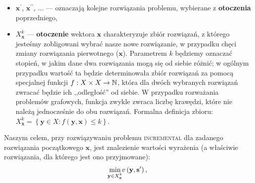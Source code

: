 \begin{itemize}
	\item $\textbf{x}^{\prime}$, $\textbf{x}^{\prime\prime}$, $\dots$ --- oznaczają kolejne rozwiązania problemu, wybierane z \textbf{otoczenia} poprzedniego,
	\item $X^{k}_{\textbf{x}}$ --- \textbf{otoczenie} wektora $\textbf{x}$ charakteryzuje zbiór rozwiązań, z którego jesteśmy zobligowani wybrać nasze nowe rozwiązanie, w przypadku chęci zmiany rozwiązania pierwotnego ($\textbf{x}$). Parametrem $k$ będziemy oznaczać stopień, w jakim dane dwa rozwiązania mogą się od siebie różnić; w ogólnym przypadku wartość ta będzie determinowała zbiór rozwiązań za pomocą specjalnej funkcji $f : X \times X \rightarrow \mathbb{N}$, która dla dwóch wybranych rozwiązań zwracać będzie ich ,,odległość'' od siebie.  W przypadku rozważania problemów grafowych, funkcja zwykle zwraca liczbę krawędzi, które nie należą jednocześnie do obu rozwiązań. Formalna definicja zbioru: $X^{k}_{\textbf{x}} = \left\{ \textbf{y} \in X : f \left( \textbf{y}, \textbf{x} \right) \leqslant k \right\}$.
\end{itemize}
Naszym celem, przy rozwiązywaniu problemu \textsc{incremental} dla zadanego rozwiązania początkowego $\textbf{x}$, jest znalezienie wartości wyrażenia (a właściwie rozwiązania, dla którego jest ono przyjmowane):
\begin{equation}
	\min_{\mathclap{\textbf{y} \in X^{k}_{\textbf{x}}}} v \left( \textbf{y}, \textbf{s}^{\prime} \right)\text{,}
\end{equation}\label{eq:imst}
